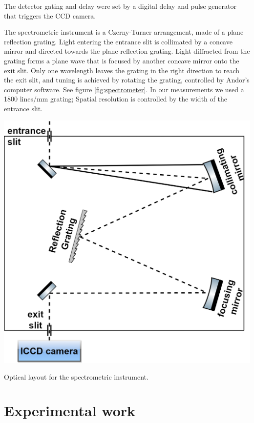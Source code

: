 \documentclass[justified,nofonts,nobib,openany]{tufte-book}
\begin{document}
The detector gating and delay were set by a digital delay and pulse generator that triggers the CCD camera.

The spectrometric instrument is a Czerny-Turner arrangement, made of a plane reflection grating. Light entering the entrance slit is collimated by a concave mirror and directed towards the plane reflection grating. Light diffracted from the grating forms a plane wave that is focused by another concave mirror onto the exit slit. Only one wavelength leaves the grating in the right direction to reach the exit slit, and tuning is achieved by rotating the grating, controlled by Andor's computer software. See figure \ref{fig:spectrometer}. In our measurements we used a 1800 lines/mm grating; Spatial resolution is controlled by the width of the entrance slit.
\begin{marginfigure}
\includegraphics[width=\marginparwidth]{./figures/spectro/spectrometer.PNG}
\caption{Optical layout for the spectrometric instrument.}
\label{fig:spectrometer}
\end{marginfigure}
	
\chapter{Experimental work}\label{chap:Experimental_work}
\end{document}
